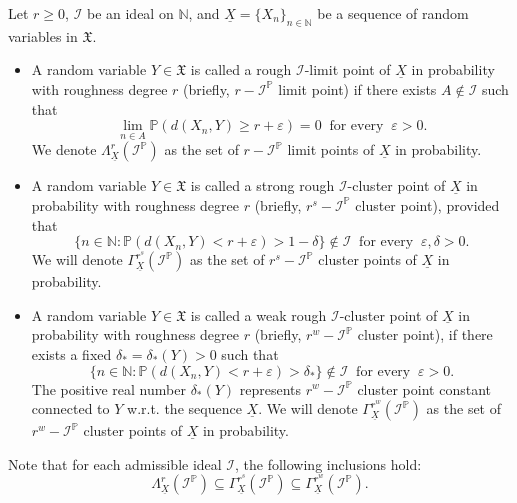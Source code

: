\documentclass[reqno]{amsart}
\begin{document}
\begin{definition}\label{cluster-limit}
Let $r\geq 0$, $\mathcal{I}$ be an ideal on $\mathbb{N}$, and $\underline{X}=\{X_n\}_{n\in\mathbb{N}}$ be a sequence of random variables in  $\mathfrak{X}$.
\begin{itemize}
\item[(a)] A random variable $Y\in\mathfrak{X}$ is called a rough $\mathcal{I}$-limit point  of $\underline{X}$ in probability with roughness degree $r$ (briefly, $r-\mathcal{I}^{\mathbb{P}}$ limit point) if there exists  $A\notin \mathcal{I}$ such that 
$$
\displaystyle\lim_{n\in A}\mathbb{P}(d(X_n,Y)\geq r+\varepsilon)=0~\mbox{ for every }~\varepsilon>0.
$$
We denote $\Lambda^{r}_{\underline{X}}(\mathcal{I}^{\mathbb{P}})$ as the set of  $r-\mathcal{I}^{\mathbb{P}}$ limit points  of $\underline{X}$ in probability.

\item[(b1)]  A random variable $Y\in\mathfrak{X}$ is called a strong rough $\mathcal{I}$-cluster point of $\underline{X}$ in probability with roughness degree $r$ (briefly, $r^s-\mathcal{I}^{\mathbb{P}}$ cluster point), provided that
$$\{n\in\mathbb{N}:\mathbb{P}(d(X_n,Y)<r+\varepsilon)>1-\delta\}\notin\mathcal{I}~\mbox{ for every }~\varepsilon,\delta>0.
$$ 
We will denote $\Gamma^{r^s}_{\underline{X}}(\mathcal{I}^{\mathbb{P}})$ as the set of $r^s-\mathcal{I}^{\mathbb{P}}$ cluster points  of $\underline{X}$ in probability.
\item[(b2)] A random variable $Y\in\mathfrak{X}$ is called a weak rough $\mathcal{I}$-cluster point of $\underline{X}$ in probability with roughness degree $r$ (briefly, $r^w-\mathcal{I}^{\mathbb{P}}$ cluster point), if there exists a fixed $\delta_{*}=\delta_{*}(Y)>0$ such that $$
\{n\in\mathbb{N}:\mathbb{P}(d(X_n,Y)<r+\varepsilon)>\delta_*\}\notin\mathcal{I}~\mbox{ for every }~\varepsilon>0.
$$ The positive real number $\delta_{*}(Y)$ represents $r^w-\mathcal{I}^{\mathbb{P}}$ cluster point constant connected to $Y$ w.r.t. the sequence $\underline{X}$. We will denote $\Gamma^{r^w}_{\underline{X}}(\mathcal{I}^{\mathbb{P}})$ as the set of $r^w-\mathcal{I}^{\mathbb{P}}$ cluster points  of $\underline{X}$ in probability. 
\end{itemize}
\end{definition}	
Note that for each admissible ideal $\mathcal{I}$, the following inclusions hold:
$$
\Lambda^{r}_{\underline{X}}(\mathcal{I}^{\mathbb{P}})\subseteq \Gamma^{r^s}_{\underline{X}}(\mathcal{I}^{\mathbb{P}})\subseteq \Gamma^{r^w}_{\underline{X}}(\mathcal{I}^{\mathbb{P}}).
$$
\end{document}
